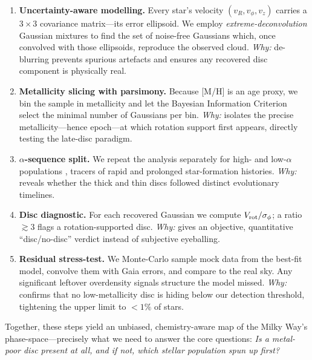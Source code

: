 \documentclass[a4paper,10pt]{article}
\begin{document}
\begin{multicols}{2}
\begin{enumerate}
  \item \textbf{Uncertainty-aware modelling.}  
        Every star’s velocity $(v_R,v_\phi,v_z)$ carries a $3\times3$ covariance
        matrix—its error ellipsoid.  We employ \emph{extreme-deconvolution}
        Gaussian mixtures \cite{Bovy2011,pygmmis} to find the set of
        noise-free Gaussians which, once convolved with those ellipsoids,
        reproduce the observed cloud.  
        \textit{Why:} de-blurring prevents spurious artefacts and ensures any
        recovered disc component is physically real.

  \item \textbf{Metallicity slicing with parsimony.}  
        Because [M/H] is an age proxy, we bin the sample in metallicity and let
        the Bayesian Information Criterion select the minimal number of
        Gaussians per bin.  
        \textit{Why:} isolates the precise metallicity—hence epoch—at which
        rotation support first appears, directly testing the late-disc
        paradigm.

  \item \textbf{$\alpha$-sequence split.}  
        We repeat the analysis separately for high- and low-$\alpha$
        populations \cite{Vis2024}, tracers of rapid and prolonged
        star-formation histories.  
        \textit{Why:} reveals whether the thick and thin discs followed
        distinct evolutionary timelines.

  \item \textbf{Disc diagnostic.}  
        For each recovered Gaussian we compute $V_{\rm rot}/\sigma_\phi$; a
        ratio $\gtrsim3$ flags a rotation-supported disc.  
        \textit{Why:} gives an objective, quantitative “disc/no-disc” verdict
        instead of subjective eyeballing.

  \item \textbf{Residual stress-test.}  
        We Monte-Carlo sample mock data from the best-fit model, convolve them
        with Gaia errors, and compare to the real sky.  Any significant
        leftover overdensity signals structure the model missed.  
        \textit{Why:} confirms that no low-metallicity disc is hiding below our
        detection threshold, tightening the upper limit to \mbox{$<1\%$} of
        stars.
\end{enumerate}

Together, these steps yield an unbiased, chemistry-aware map of the Milky
Way’s phase-space—precisely what we need to answer the core questions:  
\emph{Is a metal-poor disc present at all, and if not, which stellar population
spun up first?}



\end{multicols}
\end{document}
